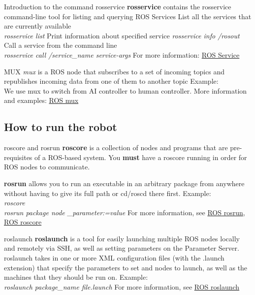 \documentclass{beamer}
\begin{document}
\begin{frame}{Introduction to the command rosservice}
\textbf{rosservice} contains the rosservice command-line tool for listing and querying ROS Services
\vfill
List all the services that are currently available\\
\textit{rosservice list}
\vfill
Print information about specified service
\textit{rosservice info /rosout}
\vfill
Call a service from the command line\\
\textit{rosservice call /service\_name service-args}
\vfill
For more information: \href{http://wiki.ros.org/rosservice}{ROS Service}
\end{frame}

\begin{frame}{MUX}
\textit{mux} is a ROS node that subscribes to a set of incoming topics and republishes incoming data from one of them to another topic
\vfill
Example:\\
We use mux to switch from AI controller to human controller.
\vfill
More information and examples: \href{http://wiki.ros.org/topic_tools/mux}{ROS mux}
\end{frame}

\subsection{How to run the robot}
\begin{frame}{roscore and rosrun}
\textbf{roscore} is a collection of nodes and programs that are pre-requisites of a ROS-based system. You \textbf{must} have a roscore running in order for ROS nodes to communicate.

\vfill

\textbf{rosrun} allows you to run an executable in an arbitrary package from anywhere without having to give its full path or cd/roscd there first.
\vfill
Example:\\
\textit{roscore}\\
\textit{rosrun package node \_parameter:=value}
\vfill
For more information, see \href{https://wiki.ros.org/rosbash\#rosrun}{ROS rosrun}, \href{https://wiki.ros.org/roscore}{ROS roscore}
\end{frame}

\begin{frame}{roslaunch}
\textbf{roslaunch} is a tool for easily launching multiple ROS nodes locally and remotely via SSH, as well as setting parameters on the Parameter Server.
\vfill
roslaunch takes in one or more XML configuration files (with the .launch extension) that specify the parameters to set and nodes to launch, as well as the machines that they should be run on.
\vfill
Example:\\
\textit{roslaunch package\_name file.launch}
\vfill
For more information, see \href{https://wiki.ros.org/roslaunch}{ROS roslaunch}
\end{frame}
\end{document}
